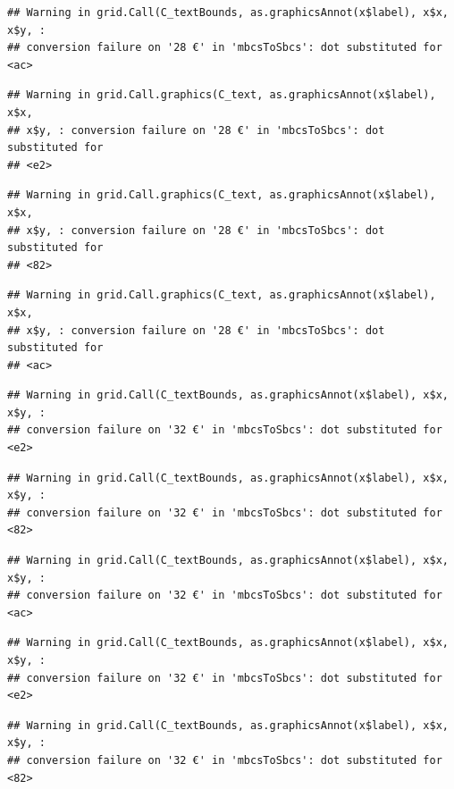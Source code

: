 \documentclass[]{gitbook}
\begin{document}
\begin{verbatim}
## Warning in grid.Call(C_textBounds, as.graphicsAnnot(x$label), x$x, x$y, :
## conversion failure on '28 €' in 'mbcsToSbcs': dot substituted for <ac>
\end{verbatim}

\begin{verbatim}
## Warning in grid.Call.graphics(C_text, as.graphicsAnnot(x$label), x$x,
## x$y, : conversion failure on '28 €' in 'mbcsToSbcs': dot substituted for
## <e2>
\end{verbatim}

\begin{verbatim}
## Warning in grid.Call.graphics(C_text, as.graphicsAnnot(x$label), x$x,
## x$y, : conversion failure on '28 €' in 'mbcsToSbcs': dot substituted for
## <82>
\end{verbatim}

\begin{verbatim}
## Warning in grid.Call.graphics(C_text, as.graphicsAnnot(x$label), x$x,
## x$y, : conversion failure on '28 €' in 'mbcsToSbcs': dot substituted for
## <ac>
\end{verbatim}

\begin{verbatim}
## Warning in grid.Call(C_textBounds, as.graphicsAnnot(x$label), x$x, x$y, :
## conversion failure on '32 €' in 'mbcsToSbcs': dot substituted for <e2>
\end{verbatim}

\begin{verbatim}
## Warning in grid.Call(C_textBounds, as.graphicsAnnot(x$label), x$x, x$y, :
## conversion failure on '32 €' in 'mbcsToSbcs': dot substituted for <82>
\end{verbatim}

\begin{verbatim}
## Warning in grid.Call(C_textBounds, as.graphicsAnnot(x$label), x$x, x$y, :
## conversion failure on '32 €' in 'mbcsToSbcs': dot substituted for <ac>
\end{verbatim}

\begin{verbatim}
## Warning in grid.Call(C_textBounds, as.graphicsAnnot(x$label), x$x, x$y, :
## conversion failure on '32 €' in 'mbcsToSbcs': dot substituted for <e2>
\end{verbatim}

\begin{verbatim}
## Warning in grid.Call(C_textBounds, as.graphicsAnnot(x$label), x$x, x$y, :
## conversion failure on '32 €' in 'mbcsToSbcs': dot substituted for <82>
\end{verbatim}
\end{document}
